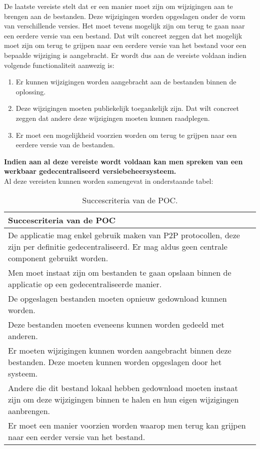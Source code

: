 De laatste vereiste stelt dat er een manier moet zijn om wijzigingen aan te brengen aan de bestanden. Deze wijzigingen worden opgeslagen onder de vorm van verschillende versies. Het moet tevens mogelijk zijn om terug te gaan naar een eerdere versie van een bestand. Dat wilt concreet zeggen dat het mogelijk moet zijn om terug te grijpen naar een eerdere versie van het bestand voor een bepaalde wijziging is aangebracht. Er wordt dus aan de vereiste voldaan indien volgende functionaliteit aanwezig is:

\begin{enumerate}
\item Er kunnen wijzigingen worden aangebracht aan de bestanden binnen de oplossing.
\item Deze wijzigingen moeten publiekelijk toegankelijk zijn. Dat wilt concreet zeggen dat andere deze wijzigingen moeten kunnen raadplegen.
\item Er moet een mogelijkheid voorzien worden om terug te grijpen naar een eerdere versie van de bestanden. 
\end{enumerate}

\textbf{Indien aan al deze vereiste wordt voldaan kan men spreken van een werkbaar gedecentraliseerd versiebeheersysteem.}\\

Al deze vereisten kunnen worden samengevat in onderstaande tabel:
\begin{table}[h!]
	\centering
	\begin{tabular}{ |p{14cm}|}
 		\hline
 		\large \textbf{Succescriteria van de POC} \\
 		\hline
 		De applicatie mag enkel gebruik maken van P2P protocollen, deze zijn per definitie gedecentraliseerd. Er mag aldus geen centrale component gebruikt worden.\\
 		\hline 
 		Men moet instaat zijn om bestanden te gaan opslaan binnen de applicatie op een gedecentraliseerde manier.\\
 		\hline
 		De opgeslagen bestanden moeten opnieuw gedownload kunnen worden.\\
 		\hline
		Deze bestanden moeten eveneens kunnen worden gedeeld met anderen.\\
 		\hline
 		Er moeten wijzigingen kunnen worden aangebracht binnen deze bestanden. Deze moeten kunnen worden opgeslagen door het systeem.\\
 		\hline
 		Andere die dit bestand lokaal hebben gedownload moeten instaat zijn om deze wijzigingen binnen te halen en hun eigen wijzigingen aanbrengen.\\
 		\hline
 		Er moet een manier voorzien worden waarop men terug kan grijpen naar een eerder versie van het bestand.\\
 		\hline
 	\end{tabular}
	\label{suc_crit}
	\caption{Succescriteria van de POC.}
\end{table}
\newpage
